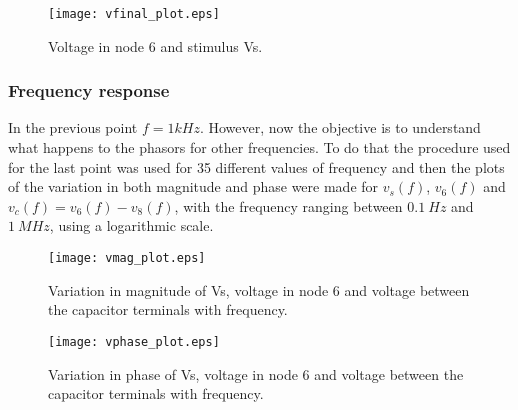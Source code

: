
\begin{figure}[h] \centering
\texttt{[image: vfinal\_plot.eps]}
\caption{Voltage in node 6 and stimulus Vs.}
\label{fig:final}
\end{figure}





\subsubsection{Frequency response}  %
In the previous point $f=1kHz$. However, now the objective is to understand what happens to the phasors for other frequencies. To do that the procedure used for the last point was used for 35 different values of frequency and then the plots of the variation in both magnitude and phase were made for $v_s(f)$, $v_6(f)$ and $v_c(f) = v_6(f)-v_8(f)$, with the frequency ranging between $0.1 \ Hz$ and $1 \ MHz$, using a logarithmic scale.

\begin{figure}[h] \centering
\texttt{[image: vmag\_plot.eps]}
\caption{Variation in magnitude of Vs, voltage in node 6 and voltage between the capacitor terminals with frequency.}
\label{fig:magnitude}
\end{figure}


\begin{figure}[h] \centering
\texttt{[image: vphase\_plot.eps]}
\caption{Variation in phase of Vs, voltage in node 6 and voltage between the capacitor terminals with frequency.}
\label{fig:phase}
\end{figure}





